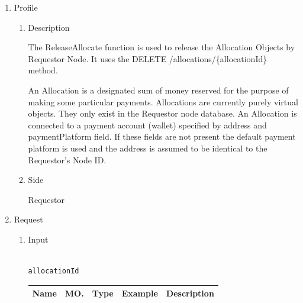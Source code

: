 \begin{enumerate}

\item Profile

\begin{enumerate}

\item Description

The ReleaseAllocate function is used to release the Allocation Objects by Requestor Node. 
It uses the DELETE /allocations/\{allocationId\} method.

An Allocation is a designated sum of money reserved for the purpose of making some particular payments. 
Allocations are currently purely virtual objects. They only exist in the Requestor node database.
An Allocation is connected to a payment account (wallet) specified by address and paymentPlatform field. 
If these fields are not present the default payment platform is used and the address is assumed 
to be identical to the Requestor's Node ID.

 
\item Side

Requestor

\end{enumerate}

\item Request

\begin{enumerate}

\item Input

\begin{tcolorbox}[boxrule=0pt, frame empty]
\begin{verbatim}

allocationId

\end{verbatim}
\end{tcolorbox}



\begin{table}[H]
\footnotesize

\begin{center}
\begin{tabular}{|p{3cm}|l|p{3cm}|p{3cm}|p{4cm}|} 
\hline
\rowcolor{lightgray}	Name	& MO.	& Type	& Example & 	Description \\
\hline


\end{tabular}
\end{center}
\end{table}
\end{enumerate}
\end{enumerate}

